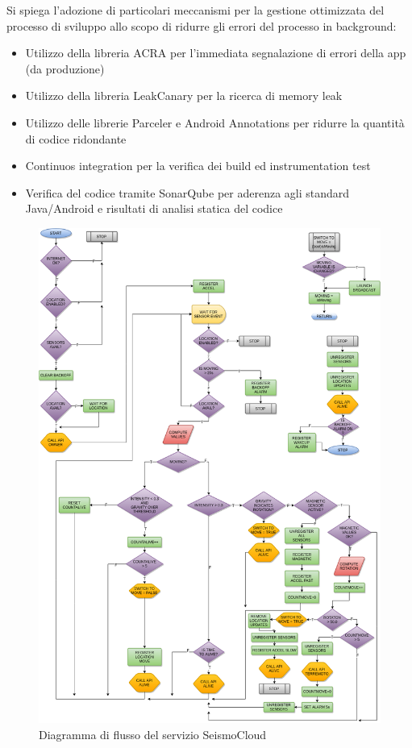\documentclass[a4paper,10pt]{memoir}
\begin{document}
Si spiega l'adozione di particolari meccanismi per la gestione ottimizzata del processo di sviluppo allo scopo di ridurre gli errori del processo in background:

\begin{itemize}
\item Utilizzo della libreria ACRA per l'immediata segnalazione di errori della app (da produzione)
\item Utilizzo della libreria LeakCanary per la ricerca di memory leak
\item Utilizzo delle librerie Parceler e Android Annotations per ridurre la quantità di codice ridondante
\item Continuos integration per la verifica dei build ed instrumentation test
\item Verifica del codice tramite SonarQube per aderenza agli standard Java/Android e risultati di analisi statica del codice
\end{itemize}

\clearpage

\begin{figure}[ht]
\centering
\caption{Diagramma di flusso del servizio SeismoCloud}
\label{fig:serviceflowdiagram}
\includegraphics[width=\textwidth]{SeismoCloud_flowdiag}
\end{figure}
\end{document}
